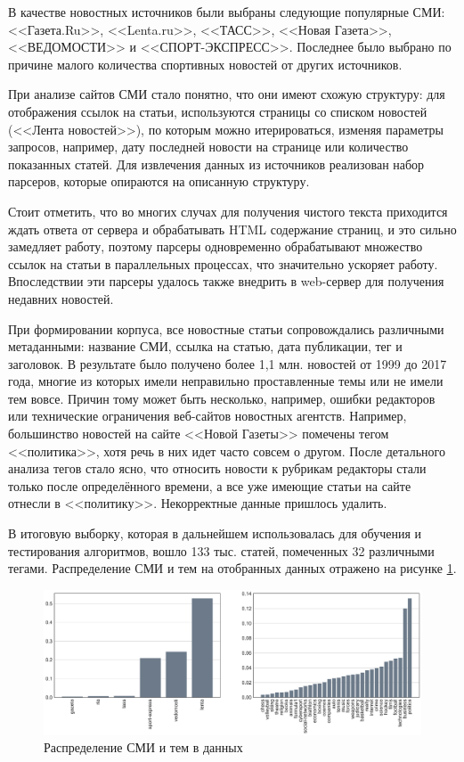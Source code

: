 \documentclass[a4paper, 14pt]{extarticle}
\begin{document}
В качестве новостных источников были выбраны следующие популярные СМИ:
<<Газета.Ru>>, <<Lenta.ru>>, <<ТАСС>>, <<Новая Газета>>, <<ВЕДОМОСТИ>> и <<СПОРТ-ЭКСПРЕСС>>. Последнее было выбрано
по причине малого количества спортивных новостей от других источников.

При анализе сайтов СМИ стало понятно, что они имеют схожую структуру: для отображения ссылок на статьи,
используются страницы со списком новостей (<<Лента новостей>>), по которым можно итерироваться,
изменяя параметры запросов, например, дату последней новости на странице или количество показанных статей.
Для извлечения данных из источников реализован набор парсеров, которые опираются на описанную структуру.

Стоит отметить, что во многих случах для получения чистого текста приходится ждать ответа от сервера и обрабатывать 
HTML содержание страниц, и это сильно замедляет работу, поэтому парсеры одновременно обрабатывают множество ссылок
на статьи в параллельных процессах, что значительно ускоряет работу. Впоследствии эти парсеры удалось также внедрить в web-сервер для получения недавних новостей.

При формировании корпуса, все новостные статьи сопровождались различными метаданными: название СМИ, ссылка на статью,
дата публикации, тег и заголовок. В результате было получено более 1,1 млн. новостей от 1999 до 2017 года, многие из которых имели
неправильно проставленные темы или не имели тем вовсе. Причин тому может быть несколько, например, ошибки редакторов или технические ограничения веб-сайтов новостных агентств. Например, большинство новостей на сайте <<Новой Газеты>> помечены тегом <<политика>>, хотя речь в них идет часто совсем о другом. После детального анализа тегов стало ясно, что относить новости к рубрикам редакторы стали только после определённого времени, а все уже имеющие статьи на сайте отнесли в <<политику>>. Некорректные данные пришлось удалить.

В итоговую выборку, которая в дальнейшем использовалась для обучения и тестирования алгоритмов,
вошло 133 тыс. статей, помеченных 32 различными тегами. Распределение СМИ и тем на отобранных данных отражено на рисунке \ref{media_topic_distr}.
\begin{figure}[h!]
	\centering
	\includegraphics[width=1\textwidth]{media_topi_distr.pdf}
	\caption{Распределение СМИ и тем в данных}
	\label{media_topic_distr}
\end{figure}
\end{document}
